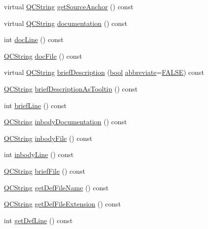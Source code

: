\begin{DoxyCompactItemize}
\item 
virtual \hyperlink{class_q_c_string}{Q\+C\+String} \hyperlink{class_definition_a5867a1097a2bc38954667d89336a5144}{get\+Source\+Anchor} () const 
\item 
virtual \hyperlink{class_q_c_string}{Q\+C\+String} \hyperlink{class_definition_a9ed55eb9487bcf1fd7ebb4a967e7b3a1}{documentation} () const 
\item 
int \hyperlink{class_definition_a1eddb1e4af4660518113a159e76ca983}{doc\+Line} () const 
\item 
\hyperlink{class_q_c_string}{Q\+C\+String} \hyperlink{class_definition_a7c5f8f793b451b8e9bbc68b40a9e8faa}{doc\+File} () const 
\item 
virtual \hyperlink{class_q_c_string}{Q\+C\+String} \hyperlink{class_definition_a748b55a1bf2566464f1e46daf1fd2ef0}{brief\+Description} (\hyperlink{qglobal_8h_a1062901a7428fdd9c7f180f5e01ea056}{bool} \hyperlink{definition_8cpp_aa4a93721b8ef0e381ba1dbe3aeeb07a6}{abbreviate}=\hyperlink{qglobal_8h_a10e004b6916e78ff4ea8379be80b80cc}{F\+A\+L\+S\+E}) const 
\item 
\hyperlink{class_q_c_string}{Q\+C\+String} \hyperlink{class_definition_ad2f43fad51460d0faa291581df896270}{brief\+Description\+As\+Tooltip} () const 
\item 
int \hyperlink{class_definition_a26799d5c03900e931fb1382a5aa56bdd}{brief\+Line} () const 
\item 
\hyperlink{class_q_c_string}{Q\+C\+String} \hyperlink{class_definition_af85914f95149aa84386f479ff075fd86}{inbody\+Documentation} () const 
\item 
\hyperlink{class_q_c_string}{Q\+C\+String} \hyperlink{class_definition_afcb2ccbaedf4f06fee6f332c3468f370}{inbody\+File} () const 
\item 
int \hyperlink{class_definition_aa443907e0f5fe04afb2851068c95d706}{inbody\+Line} () const 
\item 
\hyperlink{class_q_c_string}{Q\+C\+String} \hyperlink{class_definition_a3c37121dca58fcb1c3d499b52e0a70fd}{brief\+File} () const 
\item 
\hyperlink{class_q_c_string}{Q\+C\+String} \hyperlink{class_definition_ad399d0ee903e4102c479c2b099b0a051}{get\+Def\+File\+Name} () const 
\item 
\hyperlink{class_q_c_string}{Q\+C\+String} \hyperlink{class_definition_adf7dee9591ec45a66a9a87b9c1f2f1ee}{get\+Def\+File\+Extension} () const 
\item 
int \hyperlink{class_definition_adf4945611e38928b4dd6846c912d4b3a}{get\+Def\+Line} () const 

\end{DoxyCompactItemize}
